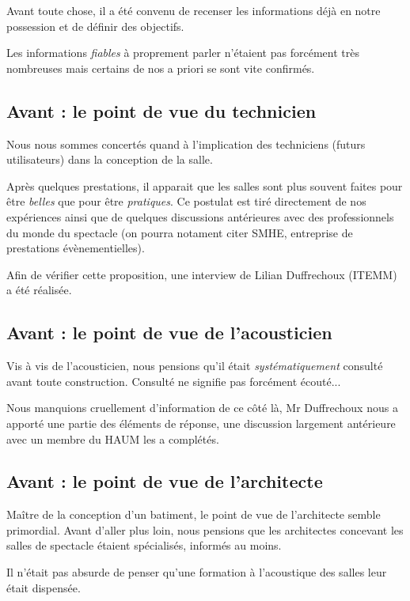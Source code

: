 \documentclass[a4paper, 11pt]{report}
\begin{document}
Avant toute chose, il a été convenu de recenser les informations déjà en notre possession et de définir des objectifs.

Les informations {\em fiables} à proprement parler n'étaient pas forcément très nombreuses mais certains de nos a priori se sont vite confirmés.

\subsection{Avant : le point de vue du technicien}

Nous nous sommes concertés quand à l'implication des techniciens (futurs utilisateurs) dans la conception de la salle.

Après quelques prestations, il apparait que les salles sont plus souvent faites pour être {\em belles} que pour être {\em pratiques}.
Ce postulat est tiré directement de nos expériences ainsi que de quelques discussions antérieures avec des professionnels du monde du spectacle (on pourra notament citer SMHE, entreprise de prestations évènementielles).

Afin de vérifier cette proposition, une interview de Lilian {\sc Duffrechoux} (ITEMM) a été réalisée.

\subsection{Avant : le point de vue de l'acousticien}

Vis à vis de l'acousticien, nous pensions qu'il était {\em systématiquement} consulté avant toute construction.
Consulté ne signifie pas forcément écouté...

Nous manquions cruellement d'information de ce côté là, Mr {\sc Duffrechoux} nous a apporté une partie des éléments de réponse, une discussion largement antérieure avec un membre du HAUM les a complétés.

\subsection{Avant : le point de vue de l'architecte}

Maître de la conception d'un batiment, le point de vue de l'architecte semble primordial.
Avant d'aller plus loin, nous pensions que les architectes concevant les salles de spectacle étaient spécialisés, informés au moins.

Il n'était pas absurde de penser qu'une formation à l'acoustique des salles leur était dispensée.
\end{document}
